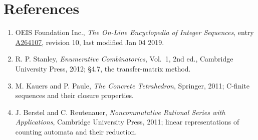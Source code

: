 \documentclass[11pt]{article}
\theoremstyle{definition}
\begin{document}
\section{References}

\begin{enumerate}

\item OEIS Foundation Inc., \emph{The On-Line Encyclopedia of Integer Sequences}, entry \href{https://oeis.org/A264107}{A264107}, revision 10, last modified Jan 04 2019.

\item R. P. Stanley, \emph{Enumerative Combinatorics}, Vol.~1, 2nd ed., Cambridge University Press, 2012; \S4.7, the transfer-matrix method.

\item M. Kauers and P. Paule, \emph{The Concrete Tetrahedron}, Springer, 2011; C-finite sequences and their closure properties.

\item J. Berstel and C. Reutenauer, \emph{Noncommutative Rational Series with Applications}, Cambridge University Press, 2011; linear representations of counting automata and their reduction.

\end{enumerate}
\end{document}
